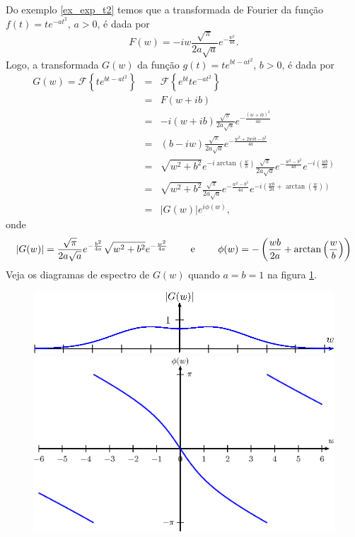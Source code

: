 \begin{ex} Do exemplo \ref{ex_exp_t2} temos que a transformada de Fourier da função $f(t)=t e^{-at^2}$, $a>0$, é dada por
\begin{equation}
F(w)=-iw\frac{\sqrt{\pi}}{2a\sqrt{a}}e^{-\frac{w^2}{4a}}.
\end{equation}
Logo, a transformada $G(w)$ da função $g(t)=t e^{bt-at^2}$, $b>0$, é dada por
\begin{eqnarray*}
G(w)=\mathcal{F}\left\{t e^{bt-at^2}\right\}&=&\mathcal{F}\left\{e^{bt}t e^{-at^2}\right\}\\
&=&F(w+ib)\\
&=&-i(w+ib)\frac{\sqrt{\pi}}{2a\sqrt{a}}e^{-\frac{(w+ib)^2}{4a}}\\
&=&(b-iw)\frac{\sqrt{\pi}}{2a\sqrt{a}}e^{-\frac{w^2+2wib-b^2}{4a}}\\
&=&\sqrt{w^2+b^2}e^{-i\arctan\left(\frac{w}{b}\right)}\frac{\sqrt{\pi}}{2a\sqrt{a}}e^{-\frac{w^2-b^2}{4a}}e^{-i\left(\frac{wb}{2a}\right)}\\
&=&\sqrt{w^2+b^2}\frac{\sqrt{\pi}}{2a\sqrt{a}}e^{-\frac{w^2-b^2}{4a}}e^{-i\left(\frac{wb}{2a}+\arctan\left(\frac{w}{b}\right)\right)}\\
&=&|G(w)|e^{i\phi(w)},
\end{eqnarray*}
onde
\begin{eqnarray*}
|G(w)|=\frac{\sqrt{\pi}}{2a\sqrt{a}}e^{-\frac{b^2}{4a}}\sqrt{w^2+b^2}e^{-\frac{w^2}{4a}}\qquad\hbox{ e }\qquad \phi(w)=-\left(\frac{wb}{2a}+\arctan\left(\frac{w}{b}\right)\right)
\end{eqnarray*}
Veja os diagramas de espectro de $G(w)$ quando $a=b=1$ na figura \ref{diag_espec_trans_4}.
\begin{figure}[!ht]
\begin{center}
\includegraphics[width=\textwidth]{cap_propriedades_transformada/pics/figura_2}\vspace{10pt}
\includegraphics[width=\textwidth]{cap_propriedades_transformada/pics/figura_3}
\end{center}
\caption{\label{diag_espec_trans_4}}
\end{figure}
\end{ex}

